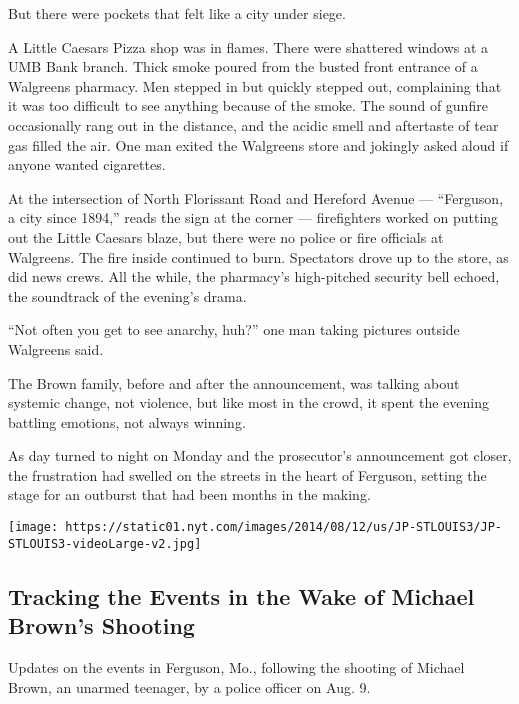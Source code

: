 But there were pockets that felt like a city under siege.

A Little Caesars Pizza shop was in flames. There were shattered windows
at a UMB Bank branch. Thick smoke poured from the busted front entrance
of a Walgreens pharmacy. Men stepped in but quickly stepped out,
complaining that it was too difficult to see anything because of the
smoke. The sound of gunfire occasionally rang out in the distance, and
the acidic smell and aftertaste of tear gas filled the air. One man
exited the Walgreens store and jokingly asked aloud if anyone wanted
cigarettes.

At the intersection of North Florissant Road and Hereford Avenue ---
``Ferguson, a city since 1894,'' reads the sign at the corner ---
firefighters worked on putting out the Little Caesars blaze, but there
were no police or fire officials at Walgreens. The fire inside continued
to burn. Spectators drove up to the store, as did news crews. All the
while, the pharmacy's high-pitched security bell echoed, the soundtrack
of the evening's drama.

``Not often you get to see anarchy, huh?'' one man taking pictures
outside Walgreens said.

The Brown family, before and after the announcement, was talking about
systemic change, not violence, but like most in the crowd, it spent the
evening battling emotions, not always winning.

As day turned to night on Monday and the prosecutor's announcement got
closer, the frustration had swelled on the streets in the heart of
Ferguson, setting the stage for an outburst that had been months in the
making.

\href{https://www.nytimes.com/interactive/2014/11/09/us/10ferguson-michael-brown-shooting-grand-jury-darren-wilson.html}{}

\texttt{[image: https://static01.nyt.com/images/2014/08/12/us/JP-STLOUIS3/JP-STLOUIS3-videoLarge-v2.jpg]}

\hypertarget{tracking-the-events-in-the-wake-of-michael-browns-shooting}{%
\subsection{Tracking the Events in the Wake of Michael Brown's
Shooting}\label{tracking-the-events-in-the-wake-of-michael-browns-shooting}}

Updates on the events in Ferguson, Mo., following the shooting of
Michael Brown, an unarmed teenager, by a police officer on Aug. 9.

